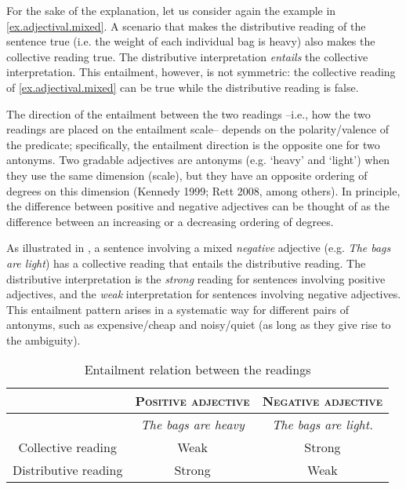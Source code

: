 \documentclass[a4paper, 11pt]{article}
\begin{document}
For the sake of the explanation, let us consider again the example in  \ref{ex.adjectival.mixed}. A scenario that makes the distributive reading of the sentence true (i.e. the weight of each individual bag is heavy) also makes the collective reading true. The distributive interpretation \emph{entails} the collective interpretation. This entailment, however, is not symmetric: the collective reading of \ref{ex.adjectival.mixed} can be true while the distributive reading is false. 

The direction of the entailment between the two readings --i.e., how the two readings are placed on the entailment scale-- depends on the polarity/valence of the predicate; specifically, the entailment direction is the opposite one for two antonyms. Two gradable adjectives are antonyms (e.g. `heavy' and `light') when they use the same dimension (scale), but they have an opposite ordering of degrees on this dimension (Kennedy 1999; Rett 2008, among others). In principle, the difference between positive and negative adjectives can be thought of as the difference between an increasing or a decreasing ordering of degrees.

As illustrated in , a sentence involving a mixed \emph{negative} adjective (e.g. \textit{The bags are light}) has a collective reading that entails the distributive reading. The distributive interpretation is the \emph{strong} reading for sentences involving positive adjectives, and the \emph{weak} interpretation for sentences involving negative adjectives. This entailment pattern arises in a systematic way for different pairs of antonyms, such as expensive/cheap and noisy/quiet (as long as they give rise to the ambiguity). 

\begin{table}[h!]
\centering
\begin{tabular}{c|c|c}
& \textsc{Positive adjective} & \textsc{Negative adjective} \\
\hline
& \textit{The bags are heavy} & \textit{The bags are light.}\\
Collective reading & Weak & Strong \\
Distributive reading & Strong & Weak\\
\end{tabular}
\caption[]{Entailment relation between the readings}
\label{table.readings.polarity}
\end{table}
\end{document}

